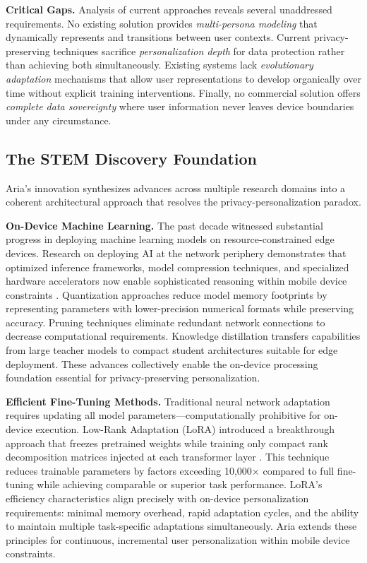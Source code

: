 \documentclass[11pt]{article}
\begin{document}
\textbf{Critical Gaps.} Analysis of current approaches reveals several unaddressed requirements. No existing solution provides \textit{multi-persona modeling} that dynamically represents and transitions between user contexts. Current privacy-preserving techniques sacrifice \textit{personalization depth} for data protection rather than achieving both simultaneously. Existing systems lack \textit{evolutionary adaptation} mechanisms that allow user representations to develop organically over time without explicit training interventions. Finally, no commercial solution offers \textit{complete data sovereignty} where user information never leaves device boundaries under any circumstance.

\vspace*{-8pt}
\subsection{The STEM Discovery Foundation}
\vspace*{-8pt}
Aria's innovation synthesizes advances across multiple research domains into a coherent architectural approach that resolves the privacy-personalization paradox.

\textbf{On-Device Machine Learning.} The past decade witnessed substantial progress in deploying machine learning models on resource-constrained edge devices. Research on deploying AI at the network periphery demonstrates that optimized inference frameworks, model compression techniques, and specialized hardware accelerators now enable sophisticated reasoning within mobile device constraints \cite{chen2019deep}. Quantization approaches reduce model memory footprints by representing parameters with lower-precision numerical formats while preserving accuracy. Pruning techniques eliminate redundant network connections to decrease computational requirements. Knowledge distillation transfers capabilities from large teacher models to compact student architectures suitable for edge deployment. These advances collectively enable the on-device processing foundation essential for privacy-preserving personalization.

\textbf{Efficient Fine-Tuning Methods.} Traditional neural network adaptation requires updating all model parameters---computationally prohibitive for on-device execution. Low-Rank Adaptation (LoRA) introduced a breakthrough approach that freezes pretrained weights while training only compact rank decomposition matrices injected at each transformer layer \cite{hu2022lora}. This technique reduces trainable parameters by factors exceeding 10,000$\times$ compared to full fine-tuning while achieving comparable or superior task performance. LoRA's efficiency characteristics align precisely with on-device personalization requirements: minimal memory overhead, rapid adaptation cycles, and the ability to maintain multiple task-specific adaptations simultaneously. Aria extends these principles for continuous, incremental user personalization within mobile device constraints.
\end{document}
